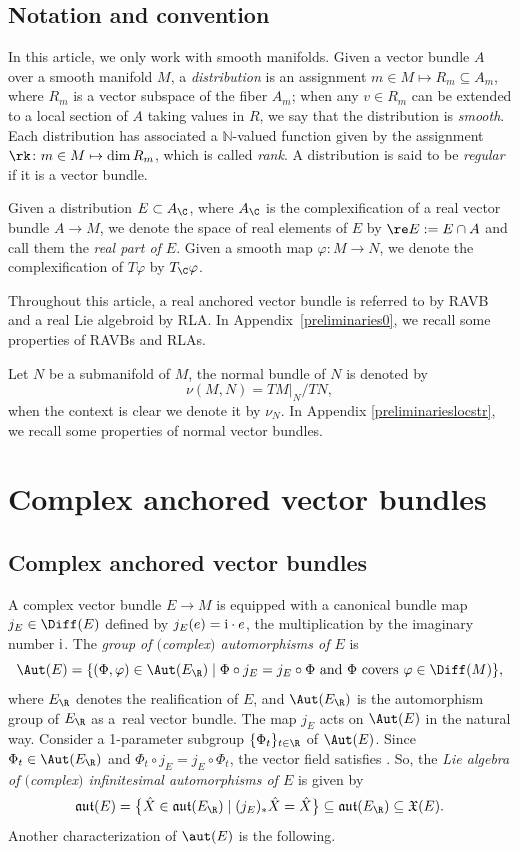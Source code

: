 \subsection*{Notation and convention}
In this article, we only work with smooth manifolds. Given a vector bundle $A$ over a smooth manifold $M$, a {\em distribution} is an assignment $m\in M\mapsto R_m\subseteq A_m$, where $R_m$ is a vector subspace of the fiber $A_m$; when any $v\in R_m$ can be extended to a local section of $A$ taking values in $R$, we say that the distribution is {\em smooth}. Each distribution has associated a $\mathbb{N}$-valued function given by the assignment $\rk\colon m\in M\mapsto\dim R_m$, which is called {\em rank}. A distribution is said to be {\em regular} if it is a vector bundle.

Given a distribution $E\subset A_\C$, where $A_{\C}$ is the complexification of a real vector bundle $A\to M$, we denote the space of real elements of $E$ by $\re E:=E\cap A$ and call them the {\em real part of $E$}. Given a smooth map $\varphi\colon M\to N$, we denote the complexification of $T\varphi$ by $T_{\C}\varphi$.

Throughout this article, a real anchored vector bundle is referred to by RAVB and a real Lie algebroid by RLA. In Appendix~\ref{preliminaries0}, we recall some properties of RAVBs and RLAs.

Let $N$ be a submanifold of $M$, the normal bundle of $N$ is denoted by
\[
\nu(M,N)=TM|_{N}/TN,
\]
when the context is clear we denote it by $\nu_N$. In Appendix \ref{preliminarieslocstr}, we recall some properties of normal vector bundles.

\section{Complex anchored vector bundles}\label{CAVB}
\subsection{Complex anchored vector bundles}
A complex vector bundle $E\to M$ is equipped with a canonical bundle map $j_E\in \Diff(E)$ defined by $j_E(e)={\rm i}\cdot e$, the multiplication by the imaginary number ${\rm i}$. The {\em group of $($complex$)$ automorphisms of $E$} is
 \[
 \Aut(E)=\{(\Phi,\varphi)\in \Aut(E_{\R})\mid \Phi\circ j_E=j_E \circ \Phi\ \text{and}\ \Phi\ \text{covers}\ \varphi\in \Diff(M)\},
 \]
 where $E_{\R}$ denotes the realification of $E$, and $\Aut(E_{\R})$ is the automorphism group of $E_{\R}$ as a~real vector bundle.
The map $j_E$ acts on $\Aut(E)$ in the natural way. Consider a 1-parameter subgroup $\{\Phi_t\}_{t\in \R}$ of $\Aut(E)$. Since $\Phi_t\in \Aut(E_{\R})$ and $\Phi_t\circ j_E=j_E\circ \Phi_t$, the vector field  satisfies . So, the {\em Lie algebra of $($complex$)$ infinitesimal automorphisms of $E$} is given by
 \[\mathfrak{aut}(E)=\bigl\{\hat{X}\in \mathfrak{aut}(E_{\R})\mid (j_E)_* \hat{X}=\hat{X}\bigr\}\subseteq \mathfrak{aut}(E_{\R})\subseteq \mathfrak{X}(E).\]
 Another characterization of $\aut(E)$ is the following.

